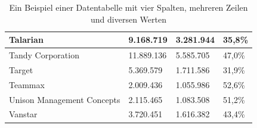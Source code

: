\begin{table}[htb]
\begin{tabular}{|l|l|l|l|}
Talarian                           & 9.168.719      & 3.281.944             & 35,8\%                     \\ \hline
Tandy Corporation                  & 11.889.136     & 5.585.705             & 47,0\%                     \\ \hline
Target                             & 5.369.579      & 1.711.586             & 31,9\%                     \\ \hline
Teammax                            & 2.009.436      & 1.055.986             & 52,6\%                     \\ \hline
Unison Management Concepts         & 2.115.465      & 1.083.508             & 51,2\%                     \\ \hline
Vanstar                            & 3.720.451      & 1.616.382             & 43,4\%                     \\ \hline
\end{tabular}%
\caption[Beispiel einer Datentabelle]{Ein Beispiel einer Datentabelle mit vier Spalten, mehreren Zeilen und diversen Werten}
\label{tbl:data}
\end{table}


